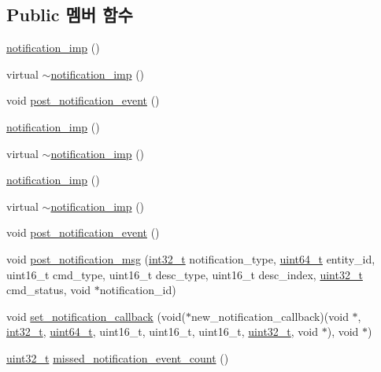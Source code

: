 \subsection*{Public 멤버 함수}
\begin{DoxyCompactItemize}
\item 
\hyperlink{classavdecc__lib_1_1notification__imp_a84888250e6639149e293bc1f0f187fc1}{notification\+\_\+imp} ()
\item 
virtual \hyperlink{classavdecc__lib_1_1notification__imp_ada7cbaddecca085d3c942ea12be3059d}{$\sim$notification\+\_\+imp} ()
\item 
void \hyperlink{classavdecc__lib_1_1notification__imp_a0b3ddaa8a01f87a1c9a13b4ff2ae0bfe}{post\+\_\+notification\+\_\+event} ()
\item 
\hyperlink{classavdecc__lib_1_1notification__imp_a84888250e6639149e293bc1f0f187fc1}{notification\+\_\+imp} ()
\item 
virtual \hyperlink{classavdecc__lib_1_1notification__imp_a4798e8175ba9c822015f464278334cdb}{$\sim$notification\+\_\+imp} ()
\item 
\hyperlink{classavdecc__lib_1_1notification__imp_a84888250e6639149e293bc1f0f187fc1}{notification\+\_\+imp} ()
\item 
virtual \hyperlink{classavdecc__lib_1_1notification__imp_a4798e8175ba9c822015f464278334cdb}{$\sim$notification\+\_\+imp} ()
\item 
void \hyperlink{classavdecc__lib_1_1notification__imp_a0b3ddaa8a01f87a1c9a13b4ff2ae0bfe}{post\+\_\+notification\+\_\+event} ()
\item 
void \hyperlink{classavdecc__lib_1_1notification_a2775ca78354ea78d68bf107c084b3822}{post\+\_\+notification\+\_\+msg} (\hyperlink{parse_8c_a37994e3b11c72957c6f454c6ec96d43d}{int32\+\_\+t} notification\+\_\+type, \hyperlink{parse_8c_aec6fcb673ff035718c238c8c9d544c47}{uint64\+\_\+t} entity\+\_\+id, uint16\+\_\+t cmd\+\_\+type, uint16\+\_\+t desc\+\_\+type, uint16\+\_\+t desc\+\_\+index, \hyperlink{parse_8c_a6eb1e68cc391dd753bc8ce896dbb8315}{uint32\+\_\+t} cmd\+\_\+status, void $\ast$notification\+\_\+id)
\item 
void \hyperlink{classavdecc__lib_1_1notification_abdf19db77644e724db59c66a2cf7c5fb}{set\+\_\+notification\+\_\+callback} (void($\ast$new\+\_\+notification\+\_\+callback)(void $\ast$, \hyperlink{parse_8c_a37994e3b11c72957c6f454c6ec96d43d}{int32\+\_\+t}, \hyperlink{parse_8c_aec6fcb673ff035718c238c8c9d544c47}{uint64\+\_\+t}, uint16\+\_\+t, uint16\+\_\+t, uint16\+\_\+t, \hyperlink{parse_8c_a6eb1e68cc391dd753bc8ce896dbb8315}{uint32\+\_\+t}, void $\ast$), void $\ast$)
\item 
\hyperlink{parse_8c_a6eb1e68cc391dd753bc8ce896dbb8315}{uint32\+\_\+t} \hyperlink{classavdecc__lib_1_1notification_a0a10f05e683c8350e8afa802b8640cbf}{missed\+\_\+notification\+\_\+event\+\_\+count} ()
\end{DoxyCompactItemize}
